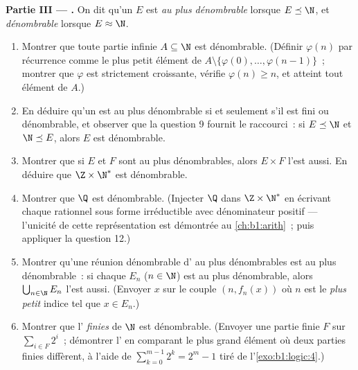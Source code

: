\begin{problem}
\medskip
\noindent\textbf{Partie III --- .} On dit qu'un
 $E$ est \emph{au plus dénombrable} lorsque $E \preceq \N$, et
\emph{dénombrable} lorsque $E \approx \N$.
\begin{enumerate}[resume]
  \item Montrer que toute partie infinie $A \subseteq \N$ est
        dénombrable. (Définir $\varphi(n)$ par récurrence comme le plus
        petit élément de $A \setminus \{\varphi(0), \dots,
        \varphi(n-1)\}$~; montrer que $\varphi$ est strictement
        croissante, vérifie $\varphi(n) \geq n$, et atteint tout élément
        de $A$.)
  \item En déduire qu'un  est au plus dénombrable si et
        seulement s'il est fini ou dénombrable, et observer que la
        question 9 fournit le raccourci~: si $E \preceq \N$ et $\N
        \preceq E$, alors $E$ est dénombrable.
  \item Montrer que si $E$ et $F$ sont au plus dénombrables, alors
        $E \times F$ l'est aussi. En déduire que $\Z \times \N^*$ est
        dénombrable.
  \item Montrer que $\Q$ est dénombrable. (Injecter $\Q$ dans $\Z
        \times \N^*$ en écrivant chaque rationnel sous forme
        irréductible avec dénominateur positif --- l'unicité de cette
        représentation est démontrée au \cref{ch:b1:arith}~; puis
        appliquer la question 12.)
  \item Montrer qu'une réunion dénombrable d' au plus
        dénombrables est au plus dénombrable~: si chaque $E_n$ ($n \in
        \N$) est au plus dénombrable, alors $\bigcup_{n \in \N} E_n$
        l'est aussi. (Envoyer $x$ sur le couple $(n, f_n(x))$ où $n$ est
        le \emph{plus petit} indice tel que $x \in E_n$.)
  \item Montrer que l' \emph{finies} de $\N$ est
        dénombrable. (Envoyer une partie finie $F$ sur $\sum_{i \in F}
        2^i$~; démontrer l' en comparant le plus grand
        élément où deux parties finies diffèrent, à l'aide de
        $\sum_{k=0}^{m-1} 2^k = 2^m - 1$ tiré de
        l'\cref{exo:b1:logic:4}.)
\end{enumerate}


\end{problem}

